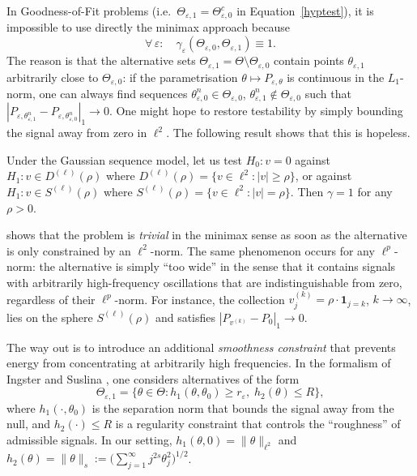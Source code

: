 In Goodness-of-Fit problems (i.e.\ $\Theta_{\varepsilon,1} = \Theta_{\varepsilon,0}^c$ in
Equation~\eqref{hyptest}), it is impossible to use directly the minimax approach because
\begin{equation}
  \forall\,\varepsilon:\quad \gamma_\varepsilon(\Theta_{\varepsilon,0},\Theta_{\varepsilon,1}) \equiv 1.
  \label{eq:trivial}
\end{equation}
The reason is that the alternative sets $\Theta_{\varepsilon,1} = \Theta \setminus \Theta_{\varepsilon,0}$
contain points $\theta_{\varepsilon,1}$ arbitrarily close to $\Theta_{\varepsilon,0}$: if the
parametrisation $\theta \mapsto P_{\varepsilon,\theta}$ is continuous in the $L_1$-norm, one can
always find sequences $\theta_{\varepsilon,0}^n \in \Theta_{\varepsilon,0}$,
$\theta_{\varepsilon,1}^n \notin \Theta_{\varepsilon,0}$ such that
$|P_{\varepsilon,\theta_{\varepsilon,1}^n} - P_{\varepsilon,\theta_{\varepsilon,0}^n}|_1 \to 0$.
One might hope to restore testability by simply bounding the signal away from zero in $\ell^2$.
The following result shows that this is hopeless.

\begin{prop} \citet[Corollary~2.1]{Ing2012}
\label{triviality}
Under the Gaussian sequence model, let us test $H_0 : v = 0$ against $H_1 : v \in D^{(\ell)}(\rho)$
where $D^{(\ell)}(\rho) = \{v \in \ell^2 : |v| \geq \rho\}$, or against $H_1 : v \in S^{(\ell)}(\rho)$
where $S^{(\ell)}(\rho) = \{v \in \ell^2 : |v| = \rho\}$.
Then $\gamma = 1$ for any $\rho > 0$.
\end{prop}

 shows that the problem is \emph{trivial} in the minimax sense as
soon as the alternative is only constrained by an $\ell^2$-norm. The same phenomenon occurs for
any $\ell^p$-norm: the alternative is simply ``too wide'' in the sense that it contains signals
with arbitrarily high-frequency oscillations that are indistinguishable from zero, regardless of
their $\ell^p$-norm. For instance, the collection
$v^{(k)}_j = \rho \cdot \mathbf{1}_{j=k}$, $k \to \infty$,
lies on the sphere $S^{(\ell)}(\rho)$ and satisfies $|P_{v^{(k)}} - P_0|_1 \to 0$.

The way out is to introduce an additional \emph{smoothness constraint} that prevents energy from
concentrating at arbitrarily high frequencies. In the formalism of Ingster and Suslina
\citeyear{Ing2012}, one considers alternatives of the form
\begin{equation}
  \Theta_{\varepsilon,1} = \bigl\{\theta \in \Theta : h_1(\theta, \theta_0) \geq r_\varepsilon,\;
  h_2(\theta) \leq R \bigr\},
  \label{eq:two-sided-alt}
\end{equation}
where $h_1(\cdot, \theta_0)$ is the separation norm that bounds the signal away from the null, and
$h_2(\cdot) \leq R$ is a regularity constraint that controls the ``roughness'' of admissible
signals. In our setting, $h_1(\theta, 0) = \|\theta\|_{\ell^2}$ and $h_2(\theta) =
\|\theta\|_s := \bigl(\sum_{j=1}^\infty j^{2s}\theta_j^2\bigr)^{1/2}$.

